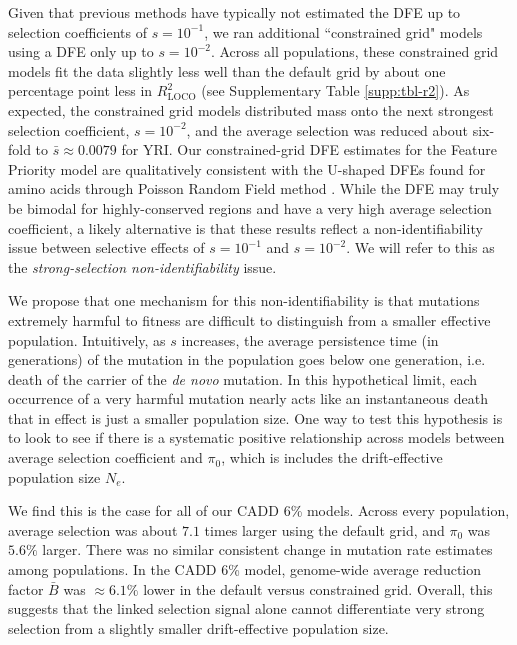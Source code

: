 \documentclass[11pt]{article}
\begin{document}
Given that previous methods have typically not estimated the DFE up to
selection coefficients of $s=10^{-1}$, we ran additional ``constrained grid"
models using a DFE only up to $s=10^{-2}$. Across all populations, these
constrained grid models fit the data slightly less well than the default grid
by about one percentage point less in $R_\text{LOCO}^2$ (see Supplementary
Table \ref{supp:tbl-r2}). As expected, the constrained grid models distributed
mass onto the next strongest selection coefficient, $s=10^{-2}$, and the
average selection was reduced about six-fold to ${\bar{s}} \approx 0.0079$ for
YRI. Our constrained-grid DFE estimates for the Feature Priority model are
qualitatively consistent with the U-shaped DFEs found for amino acids through
Poisson Random Field method \parencite{Boyko2008-tj}. While the DFE may truly
be bimodal for highly-conserved regions and have a very high average selection
coefficient, a likely alternative is that these results reflect a
non-identifiability issue between selective effects of $s=10^{-1}$ and
$s=10^{-2}$. We will refer to this as the \emph{strong-selection
non-identifiability} issue.

We propose that one mechanism for this non-identifiability is that mutations
extremely harmful to fitness are difficult to distinguish from a smaller
effective population. Intuitively, as $s$ increases, the average persistence
time (in generations) of the mutation in the population goes below one
generation, i.e. death of the carrier of the \emph{de novo} mutation. In this
hypothetical limit, each occurrence of a very harmful mutation nearly acts like
an instantaneous death that in effect is just a smaller population size. One
way to test this hypothesis is to look to see if there is a systematic positive
relationship across models between average selection coefficient and $\pi_0$,
which is includes the drift-effective population size $N_e$.

We find this is the case for all of our CADD 6\% models. Across every
population, average selection was about $7.1$ times larger using the default
grid, and $\pi_0$ was $5.6\%$ larger. There was no similar consistent change in
mutation rate estimates among populations. In the CADD 6\% model, genome-wide
average reduction factor $\bar{B}$ was $\approx 6.1\%$ lower in the default
versus constrained grid. Overall, this suggests that the linked selection
signal alone cannot differentiate very strong selection from a slightly smaller
drift-effective population size.
\end{document}
